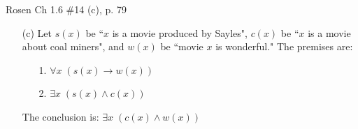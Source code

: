 \documentclass[12pt,addpoints]{exam}
\begin{document}
\begin{questions}
\printanswers

\question[8] Rosen Ch 1.6 \#14 (c), p. 79
   \ifprintanswers
        \vspace{-12pt}
    \fi
\begin{solution}
    \begin{itemize}[itemsep=0pt,parsep=0pt,topsep=0pt,partopsep=0pt]
 \item[(c)] Let $s(x)$ be ``$x$ is a movie produced by Sayles", $c(x)$ be ``$x$ is a movie about coal miners", and $w(x)$ be ``movie $x$ is wonderful."  The premises are:
    \begin{itemize}[itemsep=0pt,parsep=0pt,topsep=0pt,partopsep=0pt]
        \item[1.] $\forall x\; (s(x) \rightarrow w(x))$
        \item[2.] $\exists x\; (s(x) \wedge c(x))$
    \end{itemize}
    The conclusion is: $\exists x\; (c(x) \wedge w(x))$


\end{itemize}
\end{solution}
\end{questions}
\end{document}
